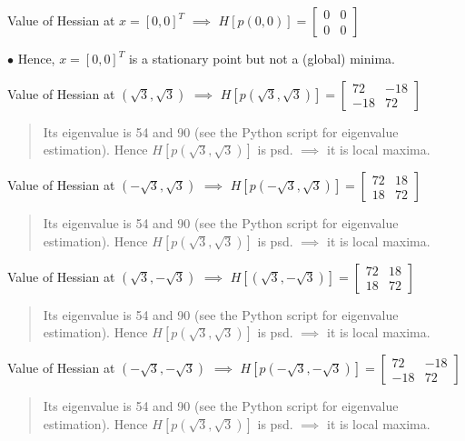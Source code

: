 \documentclass{article}%
\begin{document}
Value of Hessian at $x=[0,0]^T$ $\implies$ $H[p(0,0)]=
\begin{bmatrix}
0 & 0\\
0 & 0
\end{bmatrix}$

$\bullet$ Hence, $x=[0,0]^T$ is a stationary point but not a (global) minima.

Value of Hessian at $(\sqrt{3},\sqrt{3})$ $\implies$ $H[p(\sqrt{3},\sqrt{3})]=
\begin{bmatrix}
72 & -18\\
-18 & 72
\end{bmatrix}$

\begin{quote}
    Its eigenvalue is 54 and 90 (see the Python script for eigenvalue estimation). Hence $H[p(\sqrt{3},\sqrt{3})]$ is psd. $\implies$ it is local maxima.
\end{quote}

Value of Hessian at $(-\sqrt{3},\sqrt{3})$ $\implies$ $H[p(-\sqrt{3},\sqrt{3})]=
\begin{bmatrix}
72 & 18\\
18 & 72
\end{bmatrix}$

\begin{quote}
    Its eigenvalue is 54 and 90 (see the Python script for eigenvalue estimation). Hence $H[p(\sqrt{3},\sqrt{3})]$ is psd. $\implies$ it is local maxima.
\end{quote}

Value of Hessian at $(\sqrt{3},-\sqrt{3})$ $\implies$ $H[(\sqrt{3},-\sqrt{3})]=
\begin{bmatrix}
72 & 18\\
18 & 72
\end{bmatrix}$

\begin{quote}
    Its eigenvalue is 54 and 90 (see the Python script for eigenvalue estimation). Hence $H[p(\sqrt{3},\sqrt{3})]$ is psd. $\implies$ it is local maxima.
\end{quote}

Value of Hessian at $(-\sqrt{3},-\sqrt{3})$ $\implies$ $H[p(-\sqrt{3},-\sqrt{3})]=
\begin{bmatrix}
72 & -18\\
-18 & 72
\end{bmatrix}$

\begin{quote}
    Its eigenvalue is 54 and 90 (see the Python script for eigenvalue estimation). Hence $H[p(\sqrt{3},\sqrt{3})]$ is psd. $\implies$ it is local maxima.
\end{quote}
\end{document}
